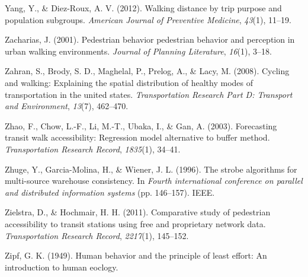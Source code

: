 \documentclass[
11pt, %
oneside, %
english, %
singlespacing, %
]{macthesis} %
\newlength{\cslhangindent}
\newenvironment{CSLReferences}[2] %
{\begin{list}{}{%
	\setlength{\itemindent}{0pt}
	\setlength{\leftmargin}{0pt}
	\setlength{\parsep}{0pt}
	\ifodd #1
	\setlength{\leftmargin}{\cslhangindent}
	\setlength{\itemindent}{-1\cslhangindent}
	\fi
	\setlength{\itemsep}{#2\baselineskip}}}
{\end{list}}
\begin{document}
\begin{CSLReferences}{1}{0}
Yang, Y., \& Diez-Roux, A. V. (2012). Walking distance by trip purpose and population subgroups. \emph{American Journal of Preventive Medicine}, \emph{43}(1), 11--19.

Zacharias, J. (2001). Pedestrian behavior pedestrian behavior and perception in urban walking environments. \emph{Journal of Planning Literature}, \emph{16}(1), 3--18.

Zahran, S., Brody, S. D., Maghelal, P., Prelog, A., \& Lacy, M. (2008). Cycling and walking: Explaining the spatial distribution of healthy modes of transportation in the united states. \emph{Transportation Research Part D: Transport and Environment}, \emph{13}(7), 462--470.

Zhao, F., Chow, L.-F., Li, M.-T., Ubaka, I., \& Gan, A. (2003). Forecasting transit walk accessibility: Regression model alternative to buffer method. \emph{Transportation Research Record}, \emph{1835}(1), 34--41.

Zhuge, Y., Garcia-Molina, H., \& Wiener, J. L. (1996). The strobe algorithms for multi-source warehouse consistency. In \emph{Fourth international conference on parallel and distributed information systems} (pp. 146--157). IEEE.

Zielstra, D., \& Hochmair, H. H. (2011). Comparative study of pedestrian accessibility to transit stations using free and proprietary network data. \emph{Transportation Research Record}, \emph{2217}(1), 145--152.

Zipf, G. K. (1949). Human behavior and the principle of least effort: An introduction to human eoclogy.

\end{CSLReferences}
\end{document}
